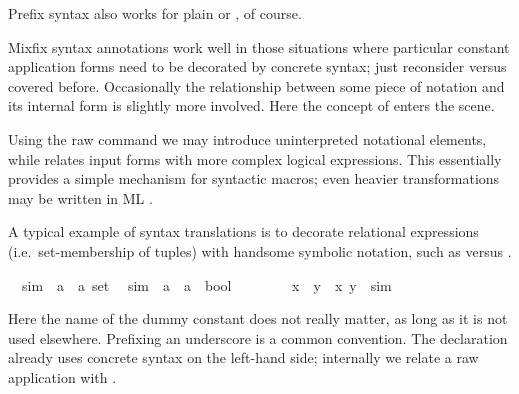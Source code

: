 \begin{isabellebody}
\begin{isamarkuptext}
  Prefix syntax also works for plain  or
  , of course.%
\end{isamarkuptext}%
\isamarkuptrue%
%
\isamarkuptrue%
%
\begin{isamarkuptext}%
Mixfix syntax annotations work well in those situations where
  particular constant application forms need to be decorated by
  concrete syntax; just reconsider  versus  covered before.  Occasionally the relationship between some
  piece of notation and its internal form is slightly more involved.
  Here the concept of  enters the scene.

  Using the raw  command we
  may introduce uninterpreted notational elements, while
   relates input forms with more complex logical
  expressions.  This essentially provides a simple mechanism for
  syntactic macros; even heavier transformations may be written in ML
  \cite{isabelle-ref}.

  \medskip A typical example of syntax translations is to decorate
  relational expressions (i.e.\ set-membership of tuples) with
  handsome symbolic notation, such as  versus
  .%
\end{isamarkuptext}%
\isamarkuptrue%
\isanewline
\ \ sim\ {\isacharcolon}{\isacharcolon}\ {\isachardoublequote}{\isacharparenleft}{\isacharprime}a\ {\isasymtimes}\ {\isacharprime}a{\isacharparenright}\ set{\isachardoublequote}\isanewline
\isanewline
\isamarkupfalse%
\isanewline
\ \ {\isachardoublequote}{\isacharunderscore}sim{\isachardoublequote}\ {\isacharcolon}{\isacharcolon}\ {\isachardoublequote}{\isacharprime}a\ {\isasymRightarrow}\ {\isacharprime}a\ {\isasymRightarrow}\ bool{\isachardoublequote}\ \ \ \ {\isacharparenleft}\ {\isachardoublequote}{\isasymapprox}{\isachardoublequote}\ {}{}{\isacharparenright}\isanewline
\isamarkupfalse%
\isanewline
\ \ {\isachardoublequote}x\ {\isasymapprox}\ y{\isachardoublequote}\ {\isasymrightleftharpoons}\ {\isachardoublequote}{\isacharparenleft}x{\isacharcomma}\ y{\isacharparenright}\ {\isasymin}\ sim{\isachardoublequote}\isamarkupfalse%
%
\begin{isamarkuptext}%
\noindent Here the name of the dummy constant  does
  not really matter, as long as it is not used elsewhere.  Prefixing
  an underscore is a common convention.  The 
  declaration already uses concrete syntax on the left-hand side;
  internally we relate a raw application  with
  .


\end{isamarkuptext}
\end{isabellebody}

